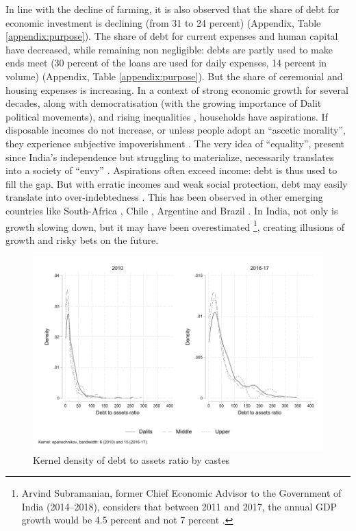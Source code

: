 \documentclass[a4paper, 11pt, onecolumn]{article}
\begin{document}
In line with the decline of farming, it is also observed that the share of debt for economic investment is declining (from 31 to 24 percent) (Appendix, Table \ref{appendix:purpose}). The share of debt for current expenses and human capital have decreased, while remaining non negligible: debts are partly used to make ends meet (30 percent of the loans are used for daily expenses, 14 percent in volume) (Appendix, Table \ref{appendix:purpose}). But the share of ceremonial and housing expenses is increasing. In a context of strong economic growth for several decades, along with democratisation (with the growing importance of Dalit political movements), and rising inequalities \citep{Chancel2019}, households have aspirations. If disposable incomes do not increase, or unless people adopt an ``ascetic morality'', they experience subjective impoverishment \citep[p.33]{Servet2013}. The very idea of ``equality'', present since India's independence but struggling to materialize, necessarily translates into a society of ``envy'' \citep{Dupuy2014}. Aspirations often exceed income: debt is thus used to fill the gap. But with erratic incomes and weak social protection, debt may easily translate into over-indebtedness \citep{Servet2013}. This has been observed in other emerging countries like South-Africa \citep{James2015}, Chile \citep{Han2012, Gonzalez2015}, Argentine \citep{Saiag2020} and Brazil \citep{Lavinas2017}. In India, not only is growth slowing down, but it may have been overestimated \citep{Subramanian2019}\footnote{Arvind Subramanian, former Chief Economic Advisor to the Government of India (2014–2018), considers that between 2011 and 2017, the annual GDP growth would be 4.5 percent and not 7 percent \citep{Subramanian2019}.}, creating illusions of growth and risky bets on the future. 

\begin{figure}[h!]
\center
\includegraphics[width=12cm]{DAR_caste.pdf}
\caption{Kernel density of debt to assets ratio by castes}
\label{kernel:DARcastes}
\end{figure}
\end{document}
